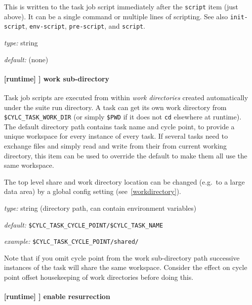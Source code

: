 This is written to the task job script immediately after the \lstinline=script=
item (just above).  It can be a single command or multiple lines of scripting.  See also
\lstinline=init-script=, \lstinline=env-script=, \lstinline=pre-script=, and
\lstinline=script=.

\begin{myitemize}
\item {\em type:} string
\item {\em default:} (none)
\end{myitemize}

\paragraph[work sub-directory]{[runtime] \textrightarrow [[\_\_NAME\_\_]] \textrightarrow work sub-directory}
\label{worksubdirectory}

Task job scripts are executed from within {\em work directories} created
automatically under the suite run directory. A task can get its own work
directory from \lstinline=$CYLC_TASK_WORK_DIR= (or simply \lstinline=$PWD= if
it does not \lstinline=cd= elsewhere at runtime). The default directory
path contains task name and cycle point, to provide a unique workspace for
every instance of every task. If several tasks need to exchange files and
simply read and write from their from current working directory, this item
can be used to override the default to make them all use the same workspace.

The top level share and work directory location can be changed (e.g.\ to a
large data area) by a global config setting (see~\ref{workdirectory}).

\begin{myitemize}
\item {\em type:} string (directory path, can contain environment variables)
\item {\em default:} \lstinline=$CYLC_TASK_CYCLE_POINT/$CYLC_TASK_NAME=
\item {\em example:} \lstinline=$CYLC_TASK_CYCLE_POINT/shared/=
\end{myitemize}

Note that if you omit cycle point from the work sub-directory path successive
instances of the task will share the same workspace.  Consider the effect on
cycle point offset housekeeping of work directories before doing this.

\paragraph[enable resurrection]{ [runtime] \textrightarrow [[\_\_NAME\_\_]] \textrightarrow enable resurrection}

